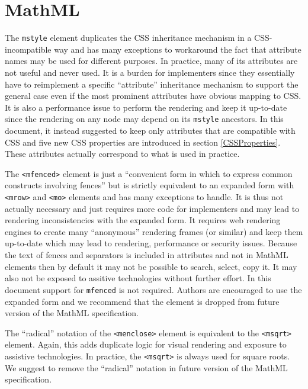 \appendix

\section{MathML}

The {\tt mstyle} element duplicates the CSS inheritance mechanism in a
CSS-incompatible way and has many exceptions to workaround the fact that
attribute names may be used for different purposes. In practice, many of its
attributes are not useful and never used. It is a burden for implementers since
they essentially have to reimplement a specific ``attribute'' inheritance
mechanism to support the general case even if the most prominent attributes
have obvious mapping to CSS. It is also a performance issue to perform the
rendering and keep it up-to-date since the rendering on any node may depend on
its {\tt mstyle} ancestors. In this document, it instead suggested to keep only
attributes that are compatible with CSS and five new CSS properties are
introduced in section \ref{CSSProperties}.
These attributes actually correspond to what is used in practice.

The {\tt <mfenced>} element is just a
``convenient form in which to express common constructs involving fences''
but is strictly equivalent to an expanded form with {\tt <mrow>} and
{\tt <mo>} elements and has many exceptions to handle.
It is thus not actually necessary and just requires more
code for implementers and may lead to rendering inconsistencies with the
expanded form. It requires web rendering engines to create many
``anonymous'' rendering frames (or similar) and keep them up-to-date which may
lead to rendering, performance or security issues. Because the text of fences
and separators is included in attributes and not in MathML elements then by
default it may not be possible to search, select, copy it. It may also not be
exposed to assitive technologies without further effort. In this document
support for {\tt mfenced} is not required.
Authors are encouraged to use the expanded form and we recommend that the
element is dropped from future version of the MathML specification.

The ``radical'' notation of the {\tt <menclose>} element is equivalent to the
{\tt <msqrt>} element. Again, this adds duplicate logic for visual rendering and
exposure to assistive technologies. In practice, the {\tt <msqrt>} is always
used for square roots. We suggest to remove the ``radical'' notation in
future version of the MathML specification.

